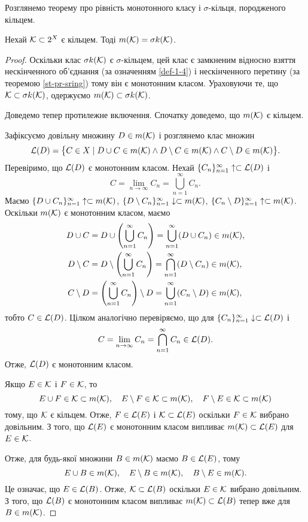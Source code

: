Розглянемо теорему про рівність монотонного класу і $\sigma$-кільця, породженого кільцем.

\begin{theorem}
	\label{th-1-5}
	Нехай $\mathcal K\subset 2^X$ є кільцем. Тоді $m(\mathcal K)=\sigma k(\mathcal K)$.
\end{theorem}

\begin{proof}  
	Оскільки клас $\sigma k(\mathcal K)$ є $\sigma$-кільцем, цей клас є замкненим відносно взяття нескінченного об'єднання (за означенням \ref{def-1-4}) і нескінченного перетину (за теоремою \ref{st-pr-sring}) тому він є монотонним класом. Ураховуючи те, що  $\mathcal K\subset \sigma k(\mathcal K)$, одержуємо $m(\mathcal K)\subset \sigma k(\mathcal K)$.
	
	Доведемо тепер протилежне включення. Спочатку доведемо, що $m(\mathcal K)$ є кільцем.
	
	Зафіксуємо довільну множину $D\in m(\mathcal K)$ і розглянемо клас множин
	$$
	\mathcal L(D)=\big\{C\in X\mid D\cup C\in m(\mathcal K) \land D\setminus C\in m(\mathcal K) \land C\setminus D\in m(\mathcal K) \big\}.
	$$
	Перевіримо, що $\mathcal L(D)$ є монотонним класом. Нехай $\{C_n\}_{n=1}^\infty\uparrow\subset \mathcal L(D)$ і
	$$
	C=\lim_{n\to\infty} C_n=\bigcup_{n=1}^\infty C_n.
	$$ 
	Маємо $\{D\cup C_n\}_{n=1}^\infty\uparrow\subset m(\mathcal K)$, $\{D\setminus C_n\}_{n=1}^\infty\downarrow\subset m(\mathcal K)$, $\{ C_n\setminus D\}_{n=1}^\infty\uparrow\subset m(\mathcal K)$. Оскільки $m(\mathcal K)$ є монотонним класом, маємо
	\begin{align*}
	D\cup C&=D\cup \left(\bigcup_{n=1}^\infty C_n\right) = \bigcup_{n=1}^\infty (D\cup C_n)\in m(\mathcal K),
	\\
	D\setminus C&=D\setminus \left(\bigcup_{n=1}^\infty C_n \right)= \bigcap_{n=1}^\infty (D\setminus C_n)\in m(\mathcal K),
	\\
	C\setminus D&=\left(\bigcup_{n=1}^\infty C_n\right) \setminus D = \bigcup_{n=1}^\infty (C_n\setminus D)\in m(\mathcal K),
	\end{align*}
	тобто $C\in\mathcal L(D)$. Цілком аналогічно перевіряємо, що для $\{C_n\}_{n=1}^\infty\downarrow\subset \mathcal L(D)$ і
	$$
	C=\lim_{n\to\infty} C_n=\bigcap_{n=1}^\infty C_n\in\mathcal L(D).
	$$ 
	Отже, $\mathcal L(D)$ є монотонним класом.
	
	Якщо $E\in\mathcal K$ і $F\in\mathcal K$, то
	$$
	E\cup F\in\mathcal K\subset m(\mathcal K),\quad E\setminus F\in\mathcal K\subset m(\mathcal K),\quad F\setminus E\in\mathcal K\subset m(\mathcal K)
	$$
	тому, що $\mathcal K$ є кільцем. Отже, $F\in\mathcal L(E)$ і $\mathcal K\subset\mathcal L(E)$ оскільки $F\in\mathcal K$ вибрано довільним. З того, що $\mathcal L(E)$ є монотонним класом випливає $m(\mathcal K)\subset\mathcal L(E)$ для $E\in\mathcal K$.
	
	Отже, для будь-якої множини $B\in m(\mathcal K)$ маємо $B\in\mathcal L(E)$, тому 
	$$
	E\cup B\in m(\mathcal K),\quad E\setminus B\in m(\mathcal K),\quad B\setminus E\in m(\mathcal K).
	$$
	Це означає, що $E\in\mathcal L(B)$. Отже, $\mathcal K\subset\mathcal L(B)$ оскільки $E\in\mathcal K$ вибрано довільним. З того, що $\mathcal L(B)$ є монотонним класом випливає $m(\mathcal K)\subset\mathcal L(B)$ тепер вже для $B\in m(\mathcal K)$.
	

\end{proof}
